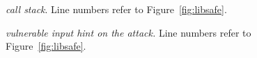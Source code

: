\begin{figure}
  \centering
  \mbox{}
  \vspace{-.1in}
  \caption{{\em \libsafe call stack}. \rm {Line numbers refer to 
Figure~\ref{fig:libsafe}.}
   }
  \vspace{-.1in}
  \label{fig:call_stack}
\end{figure}


\begin{figure}
  \centering
  \mbox{}
  \vspace{-.1in}
  \caption{{\em \xxx vulnerable input hint on the \libsafe attack.} \rm 
{Line 
numbers refer to Figure~\ref{fig:libsafe}.} 
  \vspace{-.2in}
  }
  \label{fig:libsafe_result}
\end{figure}

% 


